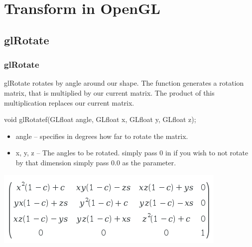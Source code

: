 \documentclass{beamer}
\begin{document}
          \section{Transform in OpenGL}


          \subsection{glRotate}
          \begin{frame}
            \frametitle{glRotate}
            glRotate rotates by angle around our shape. The function generates a rotation matrix, that is multiplied by our current matrix. The product of this multiplication replaces our current matrix.
            \begin{block}{void glRotatef(GLfloat angle,  GLfloat x,  GLfloat y,  GLfloat z);}
              \begin{itemize}
              \item angle -- specifies in degrees how far to rotate the matrix.
              \item x, y, z -- The angles to be rotated. simply pass 0 in if you wish to not rotate by that dimension simply pass 0.0 as the parameter.
              \end{itemize}
            \end{block}
            \includegraphics[scale=.35]{rotate_matrix.png}
          \end{frame}



\end{document}
